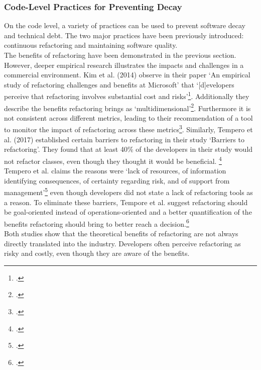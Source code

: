 \subsubsection{Code-Level Practices for Preventing Decay}
On the code level, a variety of practices can be used to prevent software decay and technical debt. The two major practices have been previously introduced: continuous refactoring and maintaining software quality.\\
The benefits of refactoring have been demonstrated in the previous section. However, deeper empirical research illustrates the impacts and challenges in a commercial environment.
Kim et al. (2014) observe in their paper `An empirical study of refactoring challenges and benefits at Microsoft' that `[d]evelopers perceive that refactoring involves substantial cost and risks'\footcite[17]{kimEmpiricalStudyRefactoringChallenges2014}.
Additionally they describe the benefits refactoring brings as `multidimensional'\footcite[17]{kimEmpiricalStudyRefactoringChallenges2014}. Furthermore it is not consistent across different metrics, leading to their recommendation of a tool to monitor the impact of refactoring across these metrics\footcite[17]{kimEmpiricalStudyRefactoringChallenges2014}.
Similarly, Tempero et al. (2017) established certain barriers to refactoring in their study `Barriers to refactoring'. They found that at least 40\% of the developers in their study would not refactor classes, even though they thought it would be beneficial. \footcite[60]{temperoBarriersRefactoring2017}\\
Tempero et al. claims the reasons were `lack of resources, of information identifying consequences, of certainty regarding risk, and of support from management'\footcite[60]{temperoBarriersRefactoring2017} even though developers did not state a lack of refactoring tools as a reason.
To eliminate these barriers, Tempore et al. suggest refactoring should be goal-oriented instead of operations-oriented and a better quantification of the benefits refactoring should bring to better reach a decision.\footcite[61]{temperoBarriersRefactoring2017}\\
Both studies show that the theoretical benefits of refactoring are not always directly translated into the industry. Developers often perceive refactoring as risky and costly, even though they are aware of the benefits.\\

